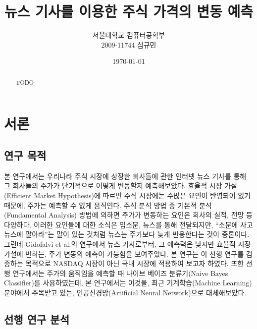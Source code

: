 \documentclass[a4paper,10pt]{article}
\begin{document}
\title{뉴스 기사를 이용한 주식 가격의 변동 예측}
\author{
  서울대학교 컴퓨터공학부 \\
  2009-11744 심규민
}
\date{\koreandate\today}
\maketitle

\begin{abstract}
TODO
\end{abstract}

\tableofcontents

\thispagestyle{empty}
\pagebreak
\setcounter{page}{1}

\section{서론}

\subsection{연구 목적}

본 연구에서는 우리나라 주식 시장에 상장한 회사들에 관한 인터넷 뉴스 기사를 통해 그 회사들의 주가가 단기적으로 어떻게 변동할지 예측해보았다.
효율적 시장 가설(Efficient Market Hypothesis)에 따르면 주식 시장에는 수많은 요인이 반영되어 있기 때문에, 주가는 예측할 수 없게 움직인다.
주식 분석 방법 중 기본적 분석(Fundamental Analysis) 방법에 의하면 주가가 변동하는 요인은 회사의 실적, 전망 등 다양하다.
이러한 요인들에 대한 소식은 입소문, 뉴스를 통해 전달되지만, ``소문에 사고 뉴스에 팔아라''는 말이 있는 것처럼 뉴스는 주가보다 늦게 반응한다는 것이 중론이다.
그런데 Gidofalvi et al.의 연구에서 뉴스 기사로부터, 그 예측력은 낮지만 효율적 시장 가설에 반하는, 주가 변동의 예측이 가능함을 보여주었다.
본 연구는 이 선행 연구를 검증하는 목적으로 NASDAQ 시장이 아닌 국내 시장에 적용하여 보고자 하였다.
또한 선행 연구에서는 주가의 움직임을 예측할 때 나이브 베이즈 분류기(Naive Bayes Classifier)를 사용하였는데,
본 연구에서는 이것을, 최근 기계학습(Machine Learning) 분야에서 주목받고 있는, 인공신경망(Artificial Neural Network)으로 대체해보았다.

\subsection{선행 연구 분석}
\end{document}
